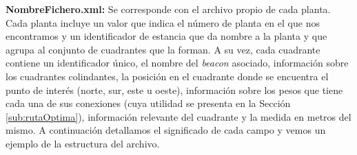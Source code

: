 




\textbf{NombreFichero.xml:} Se corresponde con el archivo propio de cada planta. Cada planta incluye un valor que indica el número de planta en el que nos encontramos y un identificador de estancia que da nombre a la planta y que agrupa al conjunto de cuadrantes que la forman. A su vez, cada cuadrante contiene un identificador único, el nombre del \textit{beacon} asociado, información sobre los cuadrantes colindantes, la posición en el cuadrante donde se encuentra el punto de interés (norte, sur, este u oeste), información sobre los pesos que tiene cada una de sus conexiones (cuya utilidad se presenta en la Sección \ref{sub:rutaOptima}), información relevante del cuadrante y la medida en metros del mismo. A continuación detallamos el significado de cada campo y vemos un ejemplo de la estructura del archivo.

